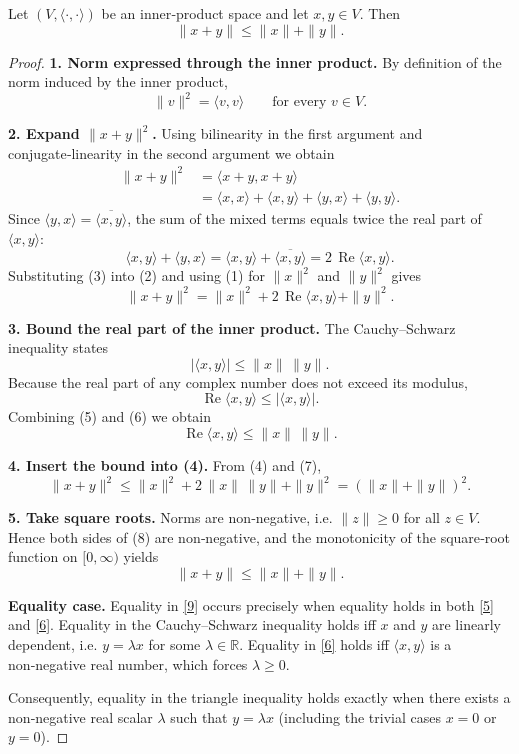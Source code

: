 \begin{theorem}
Let $(V,\langle\cdot,\cdot\rangle)$ be an inner‑product space and let $x,y\in V$. Then
\[
\|x+y\|\le \|x\|+\|y\|.
\]
\end{theorem}

\begin{proof}
\textbf{1. Norm expressed through the inner product.} By definition of the norm induced by the inner product,
\[
\|v\|^{2}= \langle v,v\rangle \qquad\text{for every }v\in V .
\tag{1}
\]

\textbf{2. Expand $\|x+y\|^{2}$.} Using bilinearity in the first argument and conjugate‑linearity in the second argument we obtain
\begin{align*}
\|x+y\|^{2}
&=\langle x+y,x+y\rangle \\[2mm]
&=\langle x,x\rangle +\langle x,y\rangle +\langle y,x\rangle +\langle y,y\rangle .
\end{align*}
Since $\langle y,x\rangle =\overline{\langle x,y\rangle}$, the sum of the mixed terms equals twice the real part of $\langle x,y\rangle$:
\[
\langle x,y\rangle +\langle y,x\rangle
= \langle x,y\rangle +\overline{\langle x,y\rangle}
= 2\,\operatorname{Re}\langle x,y\rangle .
\tag{3}
\]
Substituting (3) into (2) and using (1) for $\|x\|^{2}$ and $\|y\|^{2}$ gives
\[
\|x+y\|^{2}= \|x\|^{2}+2\,\operatorname{Re}\langle x,y\rangle+\|y\|^{2}.
\tag{4}
\]

\textbf{3. Bound the real part of the inner product.} The Cauchy–Schwarz inequality states
\[
|\langle x,y\rangle|\le \|x\|\,\|y\|.
\tag{5}
\]
Because the real part of any complex number does not exceed its modulus,
\[
\operatorname{Re}\langle x,y\rangle\le |\langle x,y\rangle|.
\tag{6}
\]
Combining (5) and (6) we obtain
\[
\operatorname{Re}\langle x,y\rangle\le \|x\|\,\|y\|.
\tag{7}
\]

\textbf{4. Insert the bound into (4).} From (4) and (7),
\[
\|x+y\|^{2}\le \|x\|^{2}+2\,\|x\|\,\|y\|+\|y\|^{2}
            = (\|x\|+\|y\|)^{2}.
\tag{8}
\]

\textbf{5. Take square roots.} Norms are non‑negative, i.e. $\|z\|\ge0$ for all $z\in V$. Hence both sides of (8) are non‑negative, and the monotonicity of the square‑root function on $[0,\infty)$ yields
\[
\|x+y\|\le \|x\|+\|y\|.
\tag{9}
\]

\medskip
\noindent\textbf{Equality case.} Equality in \eqref{9} occurs precisely when equality holds in both \eqref{5} and \eqref{6}.  
Equality in the Cauchy–Schwarz inequality holds iff $x$ and $y$ are linearly dependent, i.e. $y=\lambda x$ for some $\lambda\in\mathbb{R}$.  
Equality in \eqref{6} holds iff $\langle x,y\rangle$ is a non‑negative real number, which forces $\lambda\ge0$.  

Consequently, equality in the triangle inequality holds exactly when there exists a non‑negative real scalar $\lambda$ such that $y=\lambda x$ (including the trivial cases $x=0$ or $y=0$).
\end{proof}